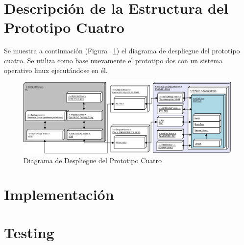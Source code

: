 		\newpage
		
		\section{Descripción de la Estructura del Prototipo Cuatro}
		Se muestra a continuación (Figura ~\ref{fig:proto4}) el diagrama de despliegue del prototipo cuatro. Se utiliza como base nuevamente el prototipo
		dos con un sistema operativo linux ejecutándose en él.

		\begin{figure}[h!]
 		\begin{center}
  		\includegraphics[width=1\textwidth,keepaspectratio=true]{./images/proto4}
  		\caption{Diagrama de Despliegue del Prototipo Cuatro}
  		\label{fig:proto4} 
 		\end{center}
		\end{figure}
	
		\newpage

		\section{Implementación}	
		
		
		
		
		
		
		
		
		
		
		\section{Testing}
	
	
	
	
	
	
	
	
	
	
		
